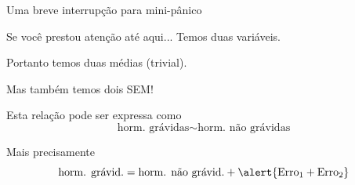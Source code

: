 \documentclass{beamer}
\begin{document}
\begin{frame}{Uma breve interrupção para mini-pânico}
  \begin{block}{Se você prestou atenção até aqui...}
    Temos \alert{duas} variáveis.

    Portanto temos duas médias (trivial).

    \bigskip
    Mas também temos \alert{dois SEM}!
  \end{block}
  \begin{block}{Esta relação pode ser expressa como}
    \begin{displaymath}
      \text{horm. grávidas} \sim \text{horm. não grávidas}
    \end{displaymath}
  \end{block}
  \begin{block}{Mais precisamente}
    \begin{displaymath}
      \text{horm. grávid.} = \text{horm. não grávid.} + \alert{\text{Erro}_1 + \text{Erro}_2}
    \end{displaymath}
  \end{block}
\end{frame}
\end{document}
